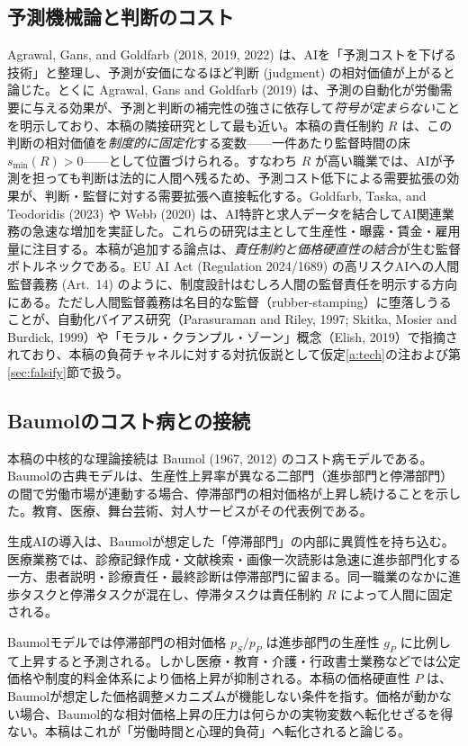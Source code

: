 \documentclass[11pt]{article}
\theoremstyle{plain}
\theoremstyle{definition}
\theoremstyle{remark}
\begin{document}
\subsection{予測機械論と判断のコスト}
Agrawal, Gans, and Goldfarb (2018, 2019, 2022) は、AIを「予測コストを下げる技術」と整理し、予測が安価になるほど判断 (judgment) の相対価値が上がると論じた。とくに Agrawal, Gans and Goldfarb (2019) は、予測の自動化が労働需要に与える効果が、予測と判断の補完性の強さに依存して\emph{符号が定まらない}ことを明示しており、本稿の隣接研究として最も近い。本稿の責任制約 $R$ は、この判断の相対価値を\emph{制度的に固定化}する変数——一件あたり監督時間の床 $s_{\min}(R)>0$——として位置づけられる。すなわち $R$ が高い職業では、AIが予測を担っても判断は法的に人間へ残るため、予測コスト低下による需要拡張の効果が、判断・監督に対する需要拡張へ直接転化する。Goldfarb, Taska, and Teodoridis (2023) や Webb (2020) は、AI特許と求人データを結合してAI関連業務の急速な増加を実証した。これらの研究は主として生産性・曝露・賃金・雇用量に注目する。本稿が追加する論点は、\emph{責任制約と価格硬直性の結合}が生む監督ボトルネックである。EU AI Act (Regulation 2024/1689) の高リスクAIへの人間監督義務 (Art.\ 14) のように、制度設計はむしろ人間の監督責任を明示する方向にある。ただし人間監督義務は名目的な監督（rubber-stamping）に堕落しうることが、自動化バイアス研究（Parasuraman and Riley, 1997; Skitka, Mosier and Burdick, 1999）や「モラル・クランプル・ゾーン」概念（Elish, 2019）で指摘されており、本稿の負荷チャネルに対する対抗仮説として仮定\ref{a:tech}の注および第\ref{sec:falsify}節で扱う。

\subsection{Baumolのコスト病との接続}
本稿の中核的な理論接続は Baumol (1967, 2012) のコスト病モデルである。Baumolの古典モデルは、生産性上昇率が異なる二部門（進歩部門と停滞部門）の間で労働市場が連動する場合、停滞部門の相対価格が上昇し続けることを示した。教育、医療、舞台芸術、対人サービスがその代表例である。

生成AIの導入は、Baumolが想定した「停滞部門」の内部に異質性を持ち込む。医療業務では、診療記録作成・文献検索・画像一次読影は急速に進歩部門化する一方、患者説明・診療責任・最終診断は停滞部門に留まる。同一職業のなかに進歩タスクと停滞タスクが混在し、停滞タスクは責任制約 $R$ によって人間に固定される。

Baumolモデルでは停滞部門の相対価格 $p_S/p_P$ は進歩部門の生産性 $g_P$ に比例して上昇すると予測される。しかし医療・教育・介護・行政書士業務などでは公定価格や制度的料金体系により価格上昇が抑制される。本稿の価格硬直性 $P$ は、Baumolが想定した価格調整メカニズムが機能しない条件を指す。価格が動かない場合、Baumol的な相対価格上昇の圧力は何らかの実物変数へ転化せざるを得ない。本稿はこれが「労働時間と心理的負荷」へ転化されると論じる。
\end{document}
